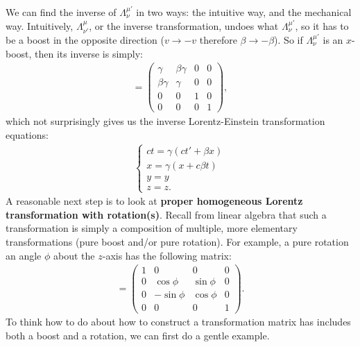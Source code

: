 \documentclass{article}
\theoremstyle{definition}
\begin{document}
We can find the inverse of $\Lambda^{\mu'}_\nu$ in two ways: the intuitive way, and the mechanical way. Intuitively, $\Lambda^{\mu}_{\nu'}$, or the inverse transformation, undoes what $\Lambda^{\mu'}_\nu$, so it has to be a boost in the opposite direction ($v \rightarrow -v$ therefore $\beta \rightarrow -\beta$). So if $\Lambda^{\mu'}_\nu$ is an $x$-boost, then its inverse is simply:
\begin{align*}
[\Lambda^{\mu}_{\nu'}] = 
\begin{pmatrix}
\gamma & \beta\gamma & 0 & 0\\
\beta\gamma & \gamma & 0 & 0\\
0 & 0 & 1 & 0\\
0 & 0 & 0 & 1
\end{pmatrix},
\end{align*}
which not surprisingly gives us the inverse Lorentz-Einstein transformation equations:
\begin{align*}
\begin{cases}
ct= \gamma(ct'+\beta x)\\
x= \gamma(x+c\beta t)\\
y= y\\
z= z.
\end{cases}
\end{align*}
A reasonable next step is to look at \textbf{proper homogeneous Lorentz transformation with rotation(s)}. Recall from linear algebra that such a transformation is simply a composition of multiple, more elementary transformations (pure boost and/or pure rotation). For example, a pure rotation an angle $\phi$ about the $z$-axis has the following matrix:
\begin{align*}
[\Lambda^{\mu'}_\nu] = 
\begin{pmatrix}
1 & 0 & 0 & 0\\
0 & \cos\phi & \sin\phi & 0\\
0 & -\sin\phi & \cos\phi & 0\\
0 & 0 & 0 & 1
\end{pmatrix}.
\end{align*}
To think how to do about how to construct a transformation matrix has includes both a boost and a rotation, we can first do a gentle example.
\end{document}
